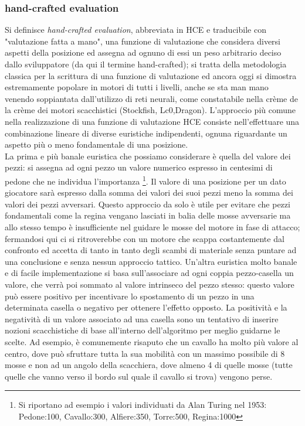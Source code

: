 \subsubsection {hand-crafted evaluation}
Si definisce \emph{hand-crafted evaluation}, abbreviata in HCE e traducibile con "valutazione fatta a mano", una funzione di valutazione che considera diversi aspetti della posizione ed assegna ad ognuno di essi un peso 
arbitrario deciso dallo sviluppatore (da qui il termine hand-crafted); si tratta della metodologia classica per la scrittura di una funzione di valutazione ed ancora oggi si dimostra estremamente popolare in  
motori di tutti i livelli, anche se sta man mano venendo soppiantata dall'utilizzo di reti neurali, come constatabile nella crème de la crème dei motori scacchistici (Stockfish, Lc0,Dragon). L'approccio più comune
nella realizzazione di una funzione di valutazione HCE consiste nell'effettuare una combinazione lineare di diverse euristiche indipendenti, ognuna riguardante un aspetto più o meno fondamentale di una posizione.
\\La prima e più banale euristica che possiamo considerare è quella del valore dei pezzi: si assegna ad ogni pezzo un valore numerico espresso in centesimi di pedone che ne individua l'importanza \footnote{Si riportano ad esempio i valori individuati
da Alan Turing nel 1953: Pedone:100, Cavallo:300, Alfiere:350, Torre:500, Regina:1000}. Il valore di una posizione per un dato giocatore sarà espresso dalla somma dei valori dei suoi pezzi meno la somma dei valori dei pezzi avversari.
Questo approccio da solo è utile per evitare che  pezzi fondamentali come la regina vengano lasciati in balia delle mosse avversarie ma allo stesso tempo è insufficiente nel guidare le mosse del motore in fase di attacco;
fermandosi qui ci si ritroverebbe con un motore che scappa costantemente dal confronto ed accetta di tanto in tanto degli scambi di materiale senza puntare ad una conclusione e senza nessun approccio tattico.
Un'altra euristica molto banale e di facile implementazione si basa sull'associare ad ogni coppia pezzo-casella un valore, che verrà poi sommato al valore intrinseco del pezzo stesso: questo valore può essere positivo
per incentivare lo spostamento di un pezzo in una determinata casella o negativo per ottenere l'effetto opposto. La positività e la negatività di un valore associato ad una casella sono un tentativo di inserire 
nozioni scacchistiche di base all'interno dell'algoritmo per meglio guidarne le scelte. Ad esempio, è comunemente risaputo che un cavallo ha molto più valore al centro, dove può sfruttare tutta la sua mobilità 
con un massimo possibile di 8 mosse e non ad un angolo della scacchiera, dove almeno 4 di quelle mosse (tutte quelle che vanno verso il bordo sul quale il cavallo si trova) vengono perse.

